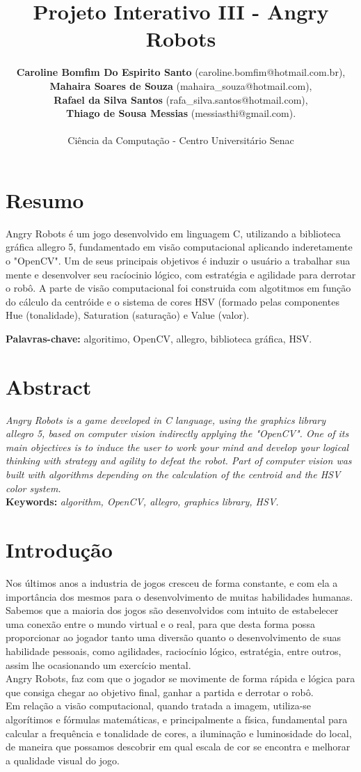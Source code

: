 \documentclass[12pt,openright,oneside,a4paper,brazil]{abntex2}
\title{Projeto Interativo III - Angry Robots}
\date{}
\author{\textbf{Caroline Bomfim Do Espirito Santo} (caroline.bomfim@hotmail.com.br), \\ \textbf{Mahaira Soares de Souza} (mahaira\_souza@hotmail.com), \\ \textbf{Rafael da Silva Santos} (rafa\_silva.santos@hotmail.com), \\ \textbf{Thiago de Sousa Messias} (messiasthi@gmail.com). \\ \\ Ciência da Computação - Centro Universitário Senac}
\begin{document}
\maketitle
 
\section*{Resumo}

Angry Robots é um jogo desenvolvido em linguagem C, utilizando a biblioteca gráfica allegro 5, fundamentado em visão computacional aplicando inderetamente o "OpenCV". Um de seus principais objetivos é induzir o usuário a trabalhar sua mente e desenvolver seu racíocinio lógico, com estratégia e agilidade para derrotar o robô. A parte de visão computacional foi construida com algotitmos em função do cálculo da centróide e o sistema de cores HSV (formado pelas componentes Hue (tonalidade), Saturation (saturação) e Value (valor).

\textbf{Palavras-chave:} algoritimo, OpenCV, allegro, biblioteca gráfica, HSV.

\section*{Abstract}

\textit{Angry Robots is a game developed in C language, using the graphics library allegro 5, based on computer vision indirectly applying the "OpenCV". One of its main objectives is to induce the user to work your mind and develop your logical thinking with strategy and agility to defeat the robot. Part of computer vision was built with algorithms depending on the calculation of the centroid and the HSV color system.} \\

\textbf{Keywords:}\textit{ algorithm, OpenCV, allegro, graphics library, HSV.} 

\section*{Introdução}

Nos últimos anos a industria de jogos cresceu de forma constante, e com ela a importância dos mesmos para o desenvolvimento de muitas habilidades humanas. Sabemos que a maioria dos jogos são desenvolvidos com intuito de estabelecer uma conexão entre o mundo virtual e o real, para que desta forma possa proporcionar ao jogador tanto uma diversão quanto o desenvolvimento de suas habilidade pessoais, como agilidades, raciocínio lógico, estratégia, entre outros, assim lhe ocasionando um exercício mental. \\
Angry Robots, faz com que o jogador se movimente de forma rápida e lógica para que consiga chegar ao objetivo final, ganhar a partida e derrotar o robô. \\
Em relação a visão computacional, quando tratada a imagem, utiliza-se algorítimos e fórmulas matemáticas, e principalmente a física, fundamental para calcular a frequência e tonalidade de cores, a iluminação e luminosidade do local, de maneira que possamos descobrir em qual escala de cor se encontra e melhorar a qualidade visual do jogo.
\end{document}
